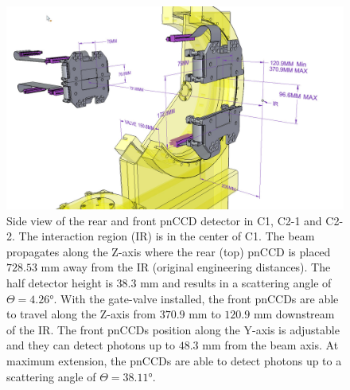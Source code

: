 \begin{figure}
	\centering
		\includegraphics[width=1.0\textwidth]{images/pnCCD-dimensions.jpg}
	\caption[Rear and front pnCCD detector geometry in the LAMP instrument.]{Side view of the rear and front pnCCD detector in C1, C2-1 and C2-2. The interaction region (IR) is in the center of C1. The beam propagates along the Z-axis where the rear (top) pnCCD is placed $728.53$ mm away from the IR (original engineering distances). The half detector height is $38.3$ mm and results in a scattering angle of $\Theta = 4.26$°. With the gate-valve installed, the front pnCCDs are able to travel along the Z-axis from $370.9$ mm to $120.9$ mm downstream of the IR. The front pnCCDs position along the Y-axis is adjustable and they can detect photons up to $48.3$ mm from the beam axis. At maximum extension, the pnCCDs are able to detect photons up to a scattering angle of $\Theta=38.11$°.}
	\label{fig:pnCCD-dimensions}
\end{figure}
